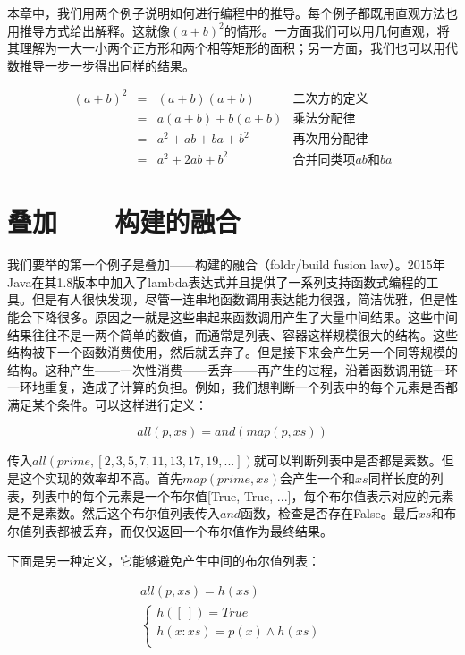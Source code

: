 \documentclass[b5paper]{ctexart}
\begin{document}
本章中，我们用两个例子说明如何进行编程中的推导。每个例子都既用直观方法也用推导方式给出解释。这就像$(a+b)^2$的情形。一方面我们可以用几何直观，将其理解为一大一小两个正方形和两个相等矩形的面积；另一方面，我们也可以用代数推导一步一步得出同样的结果。

\[
\begin{array}{rcll}
(a + b)^2 & = & (a + b)(a + b) & \text{二次方的定义} \\
          & = & a(a + b) + b(a + b) & \text{乘法分配律} \\
          & = & a^2 + ab + ba + b^2 & \text{再次用分配律} \\
          & = & a^2 + 2ab + b^2 & \text{合并同类项$ab$和$ba$}
\end{array}
\]

\section{叠加——构建的融合}

我们要举的第一个例子是叠加——构建的融合（foldr/build fusion law）。2015年Java在其1.8版本中加入了lambda表达式并且提供了一系列支持函数式编程的工具。但是有人很快发现，尽管一连串地函数调用表达能力很强，简洁优雅，但是性能会下降很多。原因之一就是这些串起来函数调用产生了大量中间结果。这些中间结果往往不是一两个简单的数值，而通常是列表、容器这样规模很大的结构。这些结构被下一个函数消费使用，然后就丢弃了。但是接下来会产生另一个同等规模的结构。这种产生——一次性消费——丢弃——再产生的过程，沿着函数调用链一环一环地重复，造成了计算的负担。例如，我们想判断一个列表中的每个元素是否都满足某个条件。可以这样进行定义\cite{GLPJ-1993}：

\[
all(p, xs) = and(map(p, xs))
\]

传入$all(prime, [2, 3, 5, 7, 11, 13, 17, 19, ...])$就可以判断列表中是否都是素数。但是这个实现的效率却不高。首先$map(prime, xs)$会产生一个和$xs$同样长度的列表，列表中的每个元素是一个布尔值[True, True, ...]，每个布尔值表示对应的元素是不是素数。然后这个布尔值列表传入$and$函数，检查是否存在False。最后$xs$和布尔值列表都被丢弃，而仅仅返回一个布尔值作为最终结果。

下面是另一种定义，它能够避免产生中间的布尔值列表：

\[
\begin{array}{l}
all(p, xs) = h(xs) \\
  \begin{cases}
  h([\ ]) = True \\
  h(x:xs) = p(x) \land h(xs) \\
  \end{cases}
\end{array}
\]
\end{document}
